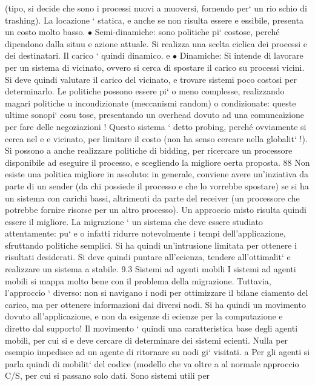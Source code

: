 \documentclass[a4paper,12pt]{article}
\begin{document}
(tipo, si decide che sono i processi nuovi a muoversi, fornendo per` un rio
schio di trashing). La locazione ` statica, e anche se non risulta essere
e
essibile, presenta un costo molto basso.
$\bullet$ Semi-dinamiche: sono politiche pi` costose, perché dipendono dalla situu
e
azione attuale. Si realizza una scelta ciclica dei processi e dei destinatari.
Il carico ` quindi dinamico.
e
$\bullet$ Dinamiche: Si intende di lavorare per un sistema di vicinato, ovvero si
cerca di spostare il carico su processi vicini. Si deve quindi valutare il
carico del vicinato, e trovare sistemi poco costosi per determinarlo.
Le politiche possono essere pi` o meno complesse, realizzando magari politiche
u
incondizionate (meccanismi random) o condizionate: queste ultime sonopi` cosu
tose, presentando un overhead dovuto ad una comuncaizione per fare delle negoziazioni ! Questo sistema ` detto probing,
perché ovviamente si cerca nel
e
e
vicinato, per limitare il costo (non ha senso cercare nella globalit` !). Si possono
a
anche realizzare politiche di bidding, per ricercare un processore disponibile ad
eseguire il processo, e scegliendo la migliore oerta proposta.
88
Non esiste una politica migliore in assoluto: in generale, conviene avere
un'inziativa da parte di un sender (da chi possiede il processo e che lo vorrebbe
spostare) se si ha un sistema con carichi bassi, altrimenti da parte del receiver
(un processore che potrebbe fornire risorse per un altro processo). Un approccio
misto risulta quindi essere il migliore.
La migrazione ` un sistema che deve essere studiato attentamente: pu`
e
o
infatti ridurre notevolmente i tempi dell'applicazione, sfruttando politiche semplici. Si ha quindi un'intrusione
limitata per ottenere i risultati desiderati. Si
deve quindi puntare all'ecienza, tendere all'ottimalit` e realizzare un sistema
a
stabile.
9.3
Sistemi ad agenti mobili
I sistemi ad agenti mobili si mappa molto bene con il problema della migrazione.
Tuttavia, l'approccio ` diverso: non si navigano i nodi per ottimizzare il bilane
ciamento del carico, ma per ottenere informazioni dai diversi nodi. Si ha quindi
un movimento dovuto all'applicazione, e non da esigenze di ecienze per la
computazione e diretto dal supporto!
Il movimento ` quindi una caratteristica base degli agenti mobili, per cui si
e
deve cercare di determinare dei sistemi ecienti. Nulla per esempio impedisce
ad un agente di ritornare su nodi gi` visitati.
a
Per gli agenti si parla quindi di mobilit` del codice (modello che va oltre
a
al normale approccio C/S, per cui si passano solo dati. Sono sistemi utili per
\end{document}
